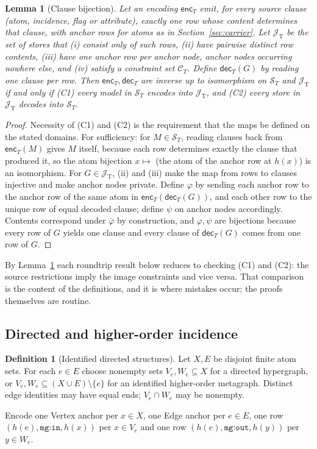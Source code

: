 \documentclass[11pt]{article}
\theoremstyle{plain}
\newtheorem{lemma}[theorem]{Lemma}
\theoremstyle{definition}
\newtheorem{definition}{Definition}
\theoremstyle{remark}
\newcommand{\enc}{\mathsf{enc}}
\newcommand{\dec}{\mathsf{dec}}
\newcommand{\mg}[1]{\texttt{mg:#1}}
\newcommand{\Img}[1]{\mathcal J_{\mathrm{#1}}}
\begin{document}
\begin{lemma}[Clause bijection]\label{lem:clause}
Let an encoding $\enc_T$ emit, for every source clause (atom, incidence, flag or
attribute), exactly one row whose content determines that clause, with anchor rows
for atoms as in Section~\ref{sec:carrier}. Let $\Img{T}$ be the set of stores that
(i) consist only of such rows, (ii) have pairwise distinct row contents, (iii) have one
anchor row per anchor node, anchor nodes occurring nowhere else, and (iv) satisfy a
constraint set $\mathcal C_T$. Define $\dec_T(G)$ by reading one clause per row. Then
$\enc_T,\dec_T$ are inverse up to isomorphism on $\mathcal S_T$ and $\Img{T}$ if and only if
\textup{(C1)} every model in $\mathcal S_T$ encodes into $\Img{T}$, and \textup{(C2)} every
store in $\Img{T}$ decodes into $\mathcal S_T$.
\end{lemma}
\begin{proof}
Necessity of (C1) and (C2) is the requirement that the maps be defined on the stated
domains. For sufficiency: for $M\in\mathcal S_T$, reading clauses back from $\enc_T(M)$
gives $M$ itself, because each row determines exactly the clause that produced it, so
the atom bijection $x\mapsto$ (the atom of the anchor row at $h(x)$) is an isomorphism.
For $G\in\Img{T}$, (ii) and (iii) make the map from rows to clauses injective and make
anchor nodes private. Define $\varphi$ by sending each anchor row to the anchor row of
the same atom in $\enc_T(\dec_T(G))$, and each other row to the unique row of equal
decoded clause; define $\psi$ on anchor nodes accordingly. Contents correspond under
$\bar\varphi$ by construction, and $\varphi,\psi$ are bijections because every row of
$G$ yields one clause and every clause of $\dec_T(G)$ comes from one row of $G$.
\end{proof}
By Lemma~\ref{lem:clause} each roundtrip result below reduces to checking (C1) and (C2):
the source restrictions imply the image constraints and vice versa. That comparison is
the content of the definitions, and it is where mistakes occur; the proofs themselves
are routine.

\subsection{Directed and higher-order incidence}
\begin{definition}[Identified directed structures]
Let $X,E$ be disjoint finite atom sets. For each $e\in E$ choose nonempty sets
$V_e,W_e\subseteq X$ for a directed hypergraph, or
$V_e,W_e\subseteq(X\cup E)\setminus\{e\}$ for an identified higher-order metagraph.
Distinct edge identities may have equal ends; $V_e\cap W_e$ may be nonempty.
\end{definition}
Encode one Vertex anchor per $x\in X$, one Edge anchor per $e\in E$, one row
$(h(e),\mg{in},h(x))$ per $x\in V_e$ and one row $(h(e),\mg{out},h(y))$ per $y\in W_e$.
\end{document}
